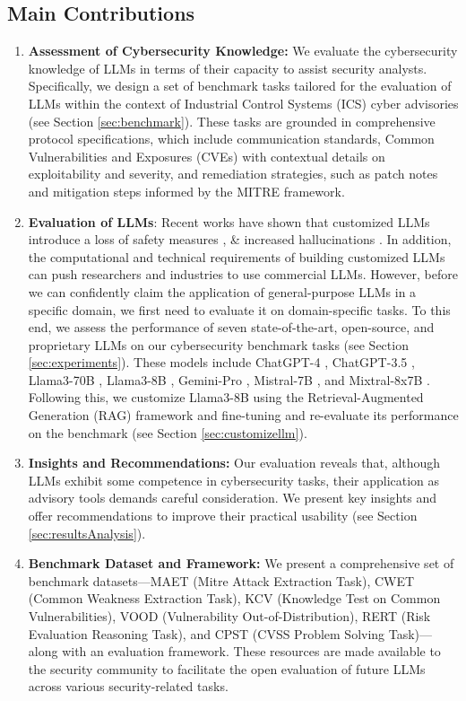 \documentclass[conference]{IEEEtran}
\begin{document}
\subsection*{Main Contributions}
\begin{enumerate}[leftmargin=*, noitemsep, topsep=0pt, partopsep=0pt]
\item \textbf{Assessment of Cybersecurity Knowledge:} We evaluate the cybersecurity knowledge of LLMs in terms of their capacity to assist security analysts. Specifically, we design a set of benchmark tasks tailored for the evaluation of LLMs within the context of Industrial Control Systems (ICS) cyber advisories (see Section \ref{sec:benchmark}). These tasks are grounded in comprehensive protocol specifications, which include communication standards, Common Vulnerabilities and Exposures (CVEs) with contextual details on exploitability and severity, and remediation strategies, such as patch notes and mitigation steps informed by the MITRE framework.

\item \textbf{Evaluation of LLMs}: Recent works have shown that customized LLMs introduce a loss of safety measures \cite{qi2023fine}, \& increased hallucinations \cite{gekhman2024does}. In addition, the computational and technical requirements of building customized LLMs can push researchers and industries to use commercial LLMs. However, before we can confidently claim the application of general-purpose LLMs in a specific domain, we first need to evaluate it on domain-specific tasks. To this end, we assess the performance of seven state-of-the-art, open-source, and proprietary LLMs on our cybersecurity benchmark tasks (see Section \ref{sec:experiments}). These models include ChatGPT-4 \cite{gpt4}, ChatGPT-3.5 \cite{gpt3.5}, Llama3-70B \cite{llama370b}, Llama3-8B \cite{llama38b}, Gemini-Pro \cite{gemini}, Mistral-7B \cite{jiang2023mistral}, and Mixtral-8x7B \cite{mixtral8x7b}. Following this, we customize Llama3-8B using the Retrieval-Augmented Generation (RAG) framework and fine-tuning and re-evaluate its performance on the benchmark (see Section \ref{sec:customizellm}).


\item \textbf{Insights and Recommendations:} Our evaluation reveals that, although LLMs exhibit some competence in cybersecurity tasks, their application as advisory tools demands careful consideration. We present key insights and offer recommendations to improve their practical usability (see Section \ref{sec:resultsAnalysis}).


\item \textbf{Benchmark Dataset and Framework:} We present a comprehensive set of benchmark datasets—MAET (Mitre Attack Extraction Task), CWET (Common Weakness Extraction Task), KCV (Knowledge Test on Common Vulnerabilities), VOOD (Vulnerability Out-of-Distribution), RERT (Risk Evaluation Reasoning Task), and CPST (CVSS Problem Solving Task)—along with an evaluation framework. These resources are made available to the security community to facilitate the open evaluation of future LLMs across various security-related tasks.
\end{enumerate}
\end{document}

